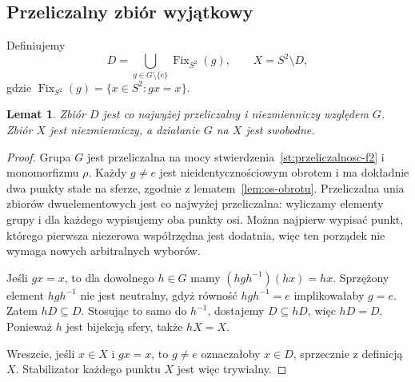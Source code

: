 \documentclass[11pt,a4paper]{article}
\numberwithin{equation}{section}
\theoremstyle{plain}
\newtheorem{lemat}[twierdzenie]{Lemat}
\theoremstyle{definition}
\theoremstyle{remark}
\newcommand{\Fix}{\operatorname{Fix}}
\begin{document}
\subsection{Przeliczalny zbiór wyjątkowy}
Definiujemy
\begin{equation}\label{eq:6-1}
 D=\bigcup_{g\in G\setminus\{e\}}\Fix_{S^2}(g),\qquad X=S^2\setminus D,
\end{equation}
gdzie $\Fix_{S^2}(g)=\{x\in S^2:gx=x\}$.
\begin{lemat}\label{lem:wyjatkowy}
Zbiór $D$ jest co najwyżej przeliczalny i niezmienniczy względem $G$. Zbiór $X$ jest niezmienniczy, a działanie $G$ na $X$ jest swobodne.
\end{lemat}
\begin{proof}
Grupa $G$ jest przeliczalna na mocy stwierdzenia~\ref{st:przeliczalnosc-f2} i monomorfizmu $\rho$. Każdy $g\ne e$ jest nieidentycznościowym obrotem i ma dokładnie dwa punkty stałe na sferze, zgodnie z lematem~\ref{lem:os-obrotu}. Przeliczalna unia zbiorów dwuelementowych jest co najwyżej przeliczalna: wyliczamy elementy grupy i dla każdego wypisujemy oba punkty osi. Można najpierw wypisać punkt, którego pierwsza niezerowa współrzędna jest dodatnia, więc ten porządek nie wymaga nowych arbitralnych wyborów.

Jeśli $gx=x$, to dla dowolnego $h\in G$ mamy $(hgh^{-1})(hx)=hx$. Sprzężony element $hgh^{-1}$ nie jest neutralny, gdyż równość $hgh^{-1}=e$ implikowałaby $g=e$. Zatem $hD\subseteq D$. Stosując to samo do $h^{-1}$, dostajemy $D\subseteq hD$, więc $hD=D$. Ponieważ $h$ jest bijekcją sfery, także $hX=X$.

Wreszcie, jeśli $x\in X$ i $gx=x$, to $g\ne e$ oznaczałoby $x\in D$, sprzecznie z definicją $X$. Stabilizator każdego punktu $X$ jest więc trywialny.
\end{proof}
\end{document}
